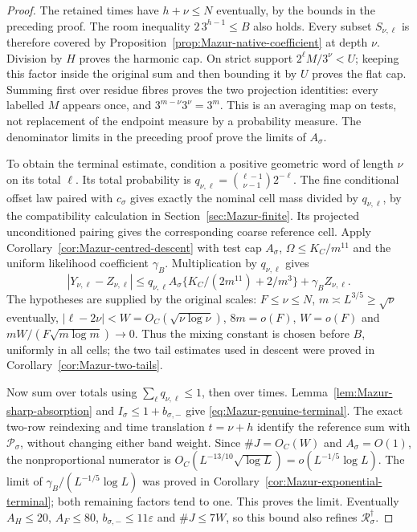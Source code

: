 \begin{proof}
The retained times have $h+\nu\le N$ eventually, by the bounds in the
preceding proof. The room inequality $2\,3^{h-1}\le B$ also holds.
Every subset $S_{\nu,\ell}$ is therefore covered by
Proposition~\ref{prop:Mazur-native-coefficient} at depth $\nu$.
Division by $H$ proves the harmonic cap. On strict support
$2^\ell M/3^\nu<U$; keeping this factor inside the original sum and then
bounding it by $U$ proves the flat cap. Summing first over residue fibres
proves the two projection identities: every labelled $M$ appears once,
and $3^{m-\nu}3^\nu=3^m$. This is an averaging map on tests, not
replacement of the endpoint measure by a probability measure.
The denominator limits in the preceding proof prove the limits of $A_\sigma$.

To obtain the terminal estimate, condition a positive geometric word of
length $\nu$ on its total $\ell$. Its total probability is
$q_{\nu,\ell}=\binom{\ell-1}{\nu-1}2^{-\ell}$. The fine conditional
offset law paired with $c_\sigma$ gives exactly the nominal cell mass
divided by $q_{\nu,\ell}$, by the compatibility calculation in
Section~\ref{sec:Mazur-finite}. Its projected unconditioned pairing gives
the corresponding coarse reference cell. Apply
Corollary~\ref{cor:Mazur-centred-descent} with test cap $A_\sigma$,
$\Omega\le K_C/m^{11}$ and the uniform likelihood coefficient
$\gamma_B$. Multiplication by $q_{\nu,\ell}$ gives
\[
 |Y_{\nu,\ell}-Z_{\nu,\ell}|
 \le q_{\nu,\ell} A_\sigma
       \{K_C/(2m^{11})+2/m^3\}+\gamma_B Z_{\nu,\ell}.
\]
The hypotheses are supplied by the original scales:
$F\le\nu\le N$, $m\asymp L^{3/5}\ge\sqrt{\nu}$ eventually,
$|\ell-2\nu|<W=O_C(\sqrt{\nu\log\nu})$,
$8m=o(F)$, $W=o(F)$ and $mW/(F\sqrt{m\log m})\to0$.
Thus the mixing constant is chosen before $B$, uniformly in all cells;
the two tail estimates used in descent were proved in
Corollary~\ref{cor:Mazur-two-tails}.

Now sum over totals using $\sum_\ell q_{\nu,\ell}\le1$, then over times.
Lemma~\ref{lem:Mazur-sharp-absorption} and
$I_\sigma\le1+b_{\sigma,-}$ give
\eqref{eq:Mazur-genuine-terminal}. The exact two-row reindexing and
time translation $t=\nu+h$ identify the reference sum with
$\mathcal P_\sigma$, without changing either band weight.
Since $\#J=O_C(W)$ and $A_\sigma=O(1)$,
the nonproportional numerator is
$O_C(L^{-13/10}\sqrt{\log L})=o(L^{-1/5}\log L)$.
The limit of $\gamma_B/(L^{-1/5}\log L)$ was proved in
Corollary~\ref{cor:Mazur-exponential-terminal}; both remaining factors
tend to one. This proves the limit. Eventually
$A_H\le20$, $A_F\le80$, $b_{\sigma,-}\le11\varepsilon$ and $\#J\le7W$,
so this bound also refines $\mathcal R_\sigma^\dagger$.
\end{proof}

